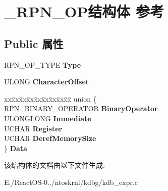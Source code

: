 \hypertarget{struct___r_p_n___o_p}{}\section{\+\_\+\+R\+P\+N\+\_\+\+O\+P结构体 参考}
\label{struct___r_p_n___o_p}
\subsection*{Public 属性}
\begin{DoxyCompactItemize}
\item 
\mbox{\label{struct___r_p_n___o_p_a52a913bec99186cf055ee8a4477d1842}} 
R\+P\+N\+\_\+\+O\+P\+\_\+\+T\+Y\+PE {\bfseries Type}
\item 
\mbox{\label{struct___r_p_n___o_p_a5b1d91affcd1f8c6470c0ba7563f5e08}} 
U\+L\+O\+NG {\bfseries Character\+Offset}
\item 
\mbox{\label{struct___r_p_n___o_p_a4fb536c9e0506267b0b51f686092aac4}} 
\begin{tabbing}
xx\=xx\=xx\=xx\=xx\=xx\=xx\=xx\=xx\=\kill
union \{\\
\>RPN\_BINARY\_OPERATOR {\bfseries BinaryOperator}\\
\>ULONGLONG {\bfseries Immediate}\\
\>UCHAR {\bfseries Register}\\
\>UCHAR {\bfseries DerefMemorySize}\\
\} {\bfseries Data}\\

\end{tabbing}\end{DoxyCompactItemize}


该结构体的文档由以下文件生成\+:\begin{DoxyCompactItemize}
\item 
E\+:/\+React\+O\+S-\/0../ntoskrnl/kdbg/kdb\+\_\+expr.\+c\end{DoxyCompactItemize}
